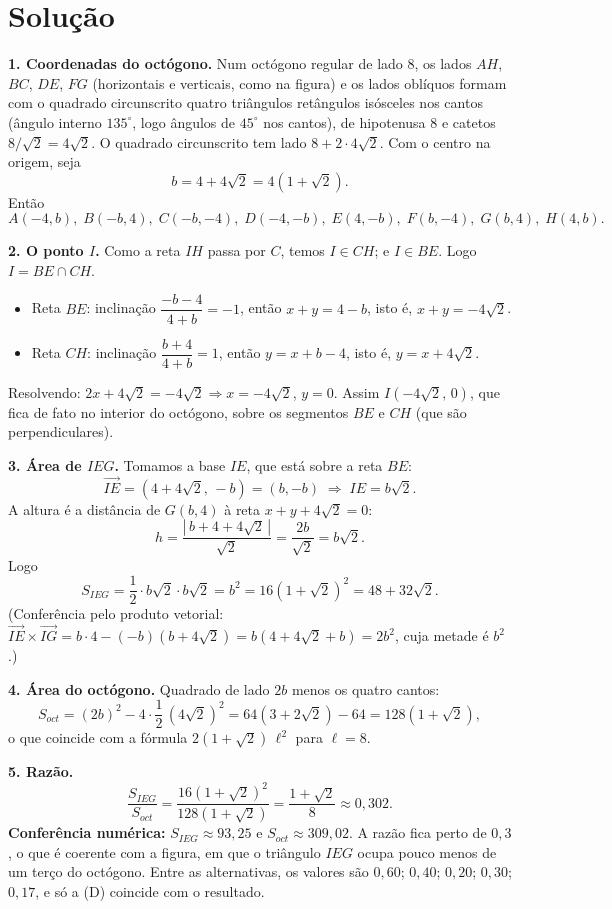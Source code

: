 \documentclass{article}%
\begin{document}
\section*{Solução}

\textbf{1. Coordenadas do octógono.} Num octógono regular de lado $8$, os lados $AH$, $BC$, $DE$, $FG$ (horizontais e verticais, como na figura) e os lados oblíquos formam com o quadrado circunscrito quatro triângulos retângulos isósceles nos cantos (ângulo interno $135^\circ$, logo ângulos de $45^\circ$ nos cantos), de hipotenusa $8$ e catetos $8/\sqrt2=4\sqrt2$. O quadrado circunscrito tem lado $8+2\cdot4\sqrt2$. Com o centro na origem, seja
\[
b=4+4\sqrt2=4(1+\sqrt2).
\]
Então
\[
A(-4,b),\; B(-b,4),\; C(-b,-4),\; D(-4,-b),\; E(4,-b),\; F(b,-4),\; G(b,4),\; H(4,b).
\]

\textbf{2. O ponto $I$.} Como a reta $IH$ passa por $C$, temos $I\in CH$; e $I\in BE$. Logo $I=BE\cap CH$.
\begin{itemize}
\item Reta $BE$: inclinação $\dfrac{-b-4}{4+b}=-1$, então $x+y=4-b$, isto é, $x+y=-4\sqrt2$.
\item Reta $CH$: inclinação $\dfrac{b+4}{4+b}=1$, então $y=x+b-4$, isto é, $y=x+4\sqrt2$.
\end{itemize}
Resolvendo: $2x+4\sqrt2=-4\sqrt2\Rightarrow x=-4\sqrt2$, $y=0$. Assim $I(-4\sqrt2,\,0)$, que fica de fato no interior do octógono, sobre os segmentos $BE$ e $CH$ (que são perpendiculares).

\textbf{3. Área de $IEG$.} Tomamos a base $IE$, que está sobre a reta $BE$:
\[
\overrightarrow{IE}=(4+4\sqrt2,\,-b)=(b,-b)\;\Rightarrow\; IE=b\sqrt2 .
\]
A altura é a distância de $G(b,4)$ à reta $x+y+4\sqrt2=0$:
\[
h=\frac{|\,b+4+4\sqrt2\,|}{\sqrt2}=\frac{2b}{\sqrt2}=b\sqrt2 .
\]
Logo
\[
S_{IEG}=\frac12\cdot b\sqrt2\cdot b\sqrt2=b^2=16(1+\sqrt2)^2=48+32\sqrt2 .
\]
(Conferência pelo produto vetorial: $\overrightarrow{IE}\times\overrightarrow{IG}=b\cdot4-(-b)(b+4\sqrt2)=b(4+4\sqrt2+b)=2b^2$, cuja metade é $b^2$.)

\textbf{4. Área do octógono.} Quadrado de lado $2b$ menos os quatro cantos:
\[
S_{oct}=(2b)^2-4\cdot\frac12\,(4\sqrt2)^2=64(3+2\sqrt2)-64=128(1+\sqrt2),
\]
o que coincide com a fórmula $2(1+\sqrt2)\,\ell^2$ para $\ell=8$.

\textbf{5. Razão.}
\[
\frac{S_{IEG}}{S_{oct}}=\frac{16(1+\sqrt2)^2}{128(1+\sqrt2)}=\frac{1+\sqrt2}{8}\approx0{,}302 .
\]
\textbf{Conferência numérica:} $S_{IEG}\approx93{,}25$ e $S_{oct}\approx309{,}02$. A razão fica perto de $0{,}3$, o que é coerente com a figura, em que o triângulo $IEG$ ocupa pouco menos de um terço do octógono. Entre as alternativas, os valores são $0{,}60$; $0{,}40$; $0{,}20$; $0{,}30$; $0{,}17$, e só a (D) coincide com o resultado.
\end{document}
